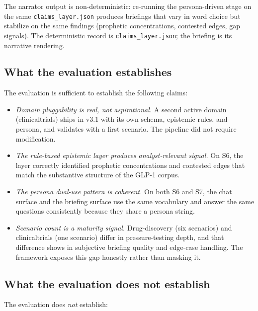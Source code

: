 The narrator output is non-deterministic: re-running the persona-driven stage on the same \texttt{claims\_layer.json} produces briefings that vary in word choice but stabilize on the same findings (prophetic concentrations, contested edges, gap signals). The deterministic record is \texttt{claims\_layer.json}; the briefing is its narrative rendering.

\subsection{What the evaluation establishes}

The evaluation is sufficient to establish the following claims:

\begin{itemize}
\item \emph{Domain pluggability is real, not aspirational.} A second active domain (clinicaltrials) ships in v3.1 with its own schema, epistemic rules, and persona, and validates with a first scenario. The pipeline did not require modification.
\item \emph{The rule-based epistemic layer produces analyst-relevant signal.} On S6, the layer correctly identified prophetic concentrations and contested edges that match the substantive structure of the GLP-1 corpus.
\item \emph{The persona dual-use pattern is coherent.} On both S6 and S7, the chat surface and the briefing surface use the same vocabulary and answer the same questions consistently because they share a persona string.
\item \emph{Scenario count is a maturity signal.} Drug-discovery (six scenarios) and clinicaltrials (one scenario) differ in pressure-testing depth, and that difference shows in subjective briefing quality and edge-case handling. The framework exposes this gap honestly rather than masking it.
\end{itemize}

\subsection{What the evaluation does not establish}

The evaluation does \emph{not} establish:

